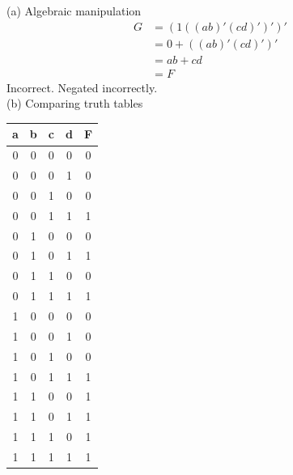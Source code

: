 \documentclass{article}
\begin{document}
\noindent (a) Algebraic manipulation \\
\begin{align*}
    G &= (1((ab)'(cd)')')' \\
    &= 0 + ((ab)'(cd)')' \\
    &= ab + cd \\
    &= F
\end{align*}
\textcolor{myred}{Incorrect. Negated incorrectly.} \\

\noindent (b) Comparing truth tables \\
\begin{minipage}{.4\textwidth}
\centering
\begin{tabular}{c c c c|c}
    a & b & c & d & F \\
    \hline
    0 & 0 & 0 & 0 & 0 \\
    0 & 0 & 0 & 1 & 0 \\
    0 & 0 & 1 & 0 & 0 \\
    0 & 0 & 1 & 1 & 1 \\
    0 & 1 & 0 & 0 & 0 \\
    0 & 1 & 0 & 1 & 1 \\
    0 & 1 & 1 & 0 & 0 \\
    0 & 1 & 1 & 1 & 1 \\
    1 & 0 & 0 & 0 & 0 \\
    1 & 0 & 0 & 1 & 0 \\
    1 & 0 & 1 & 0 & 0 \\
    1 & 0 & 1 & 1 & 1 \\
    1 & 1 & 0 & 0 & 1 \\
    1 & 1 & 0 & 1 & 1 \\
    1 & 1 & 1 & 0 & 1 \\
    1 & 1 & 1 & 1 & 1 \\
\end{tabular}
\end{minipage}
\end{document}
